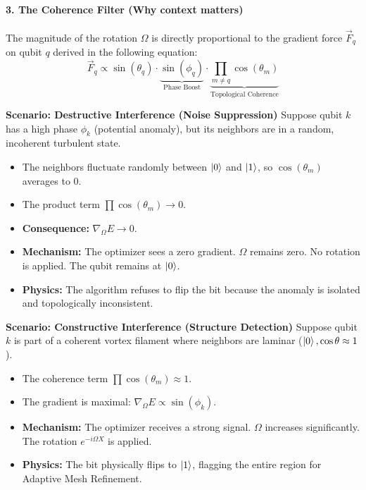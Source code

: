 \documentclass[12pt, a4paper, oneside]{report}
\begin{document}
\begin{tcolorbox}
\paragraph{3. The Coherence Filter (Why context matters)}
The magnitude of the rotation $\Omega$ is directly proportional to the gradient force $\vec{F}_q$ on qubit $q$ derived in the following equation:
\begin{equation}
    \vec{F}_q \propto \sin(\theta_q)\cdot\underbrace{\sin(\phi_q)}_{\text{Phase Boost}} \cdot\underbrace{\prod_{m \neq q} \cos(\theta_m)}_{\text{Topological Coherence}}
\label{eq:gradient-force}
\end{equation}

\textbf{Scenario: Destructive Interference (Noise Suppression)}
Suppose qubit $k$ has a high phase $\phi_k$ (potential anomaly), but its neighbors are in a random, incoherent turbulent state.
\begin{itemize}
    \item The neighbors fluctuate randomly between $\ket{0}$ and $\ket{1}$, so $\cos(\theta_m)$ averages to 0.
    \item The product term $\prod \cos(\theta_m) \to 0$.
    \item \textbf{Consequence:} $\nabla_{\Omega} E \to 0$.
    \item \textbf{Mechanism:} The optimizer sees a zero gradient. $\Omega$ remains zero. No rotation is applied. The qubit remains at $\ket{0}$.
    \item \textbf{Physics:} The algorithm refuses to flip the bit because the anomaly is isolated and topologically inconsistent.
\end{itemize}

\textbf{Scenario: Constructive Interference (Structure Detection)}
Suppose qubit $k$ is part of a coherent vortex filament where neighbors are laminar ($\ket{0}, \cos \theta \approx 1$).
\begin{itemize}
    \item The coherence term $\prod \cos(\theta_m) \approx 1$.
    \item The gradient is maximal: $\nabla_{\Omega} E \propto \sin(\phi_k)$.
    \item \textbf{Mechanism:} The optimizer receives a strong signal. $\Omega$ increases significantly. The rotation $e^{-i \Omega X}$ is applied.
    \item \textbf{Physics:} The bit physically flips to $\ket{1}$, flagging the entire region for Adaptive Mesh Refinement.
\end{itemize}
\end{tcolorbox}
\end{document}

